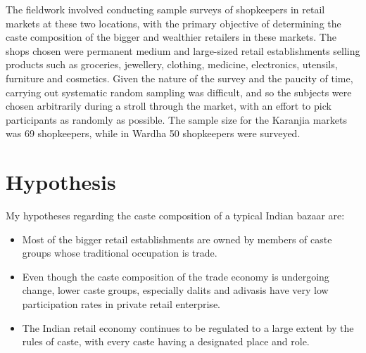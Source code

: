 \documentclass[12pt,a4paper,titlepage]{report}
\begin{document}
The fieldwork involved conducting sample surveys of shopkeepers in
retail markets at these two locations, with the primary objective of
determining the caste composition of the bigger and wealthier retailers
in these markets. The shops chosen were permanent medium and large-sized
retail establishments selling products such as groceries, jewellery,
clothing, medicine, electronics, utensils, furniture and cosmetics.
Given the nature of the survey and the paucity of time, carrying out
systematic random sampling was difficult, and so the subjects were
chosen arbitrarily during a stroll through the market, with an effort to
pick participants as randomly as possible. The sample size for the
Karanjia markets was 69 shopkeepers, while in Wardha 50 shopkeepers were
surveyed.

\section{Hypothesis}\label{hypothesis}

My hypotheses regarding the caste composition of a typical Indian bazaar
are:

\begin{itemize}
\item
  Most of the bigger retail establishments are owned by members of caste
  groups whose traditional occupation is trade.
\item
  Even though the caste composition of the trade economy is undergoing
  change, lower caste groups, especially dalits and adivasis have very
  low participation rates in private retail enterprise.
\item
  The Indian retail economy continues to be regulated to a large extent
  by the rules of caste, with every caste having a designated place and
  role.
\end{itemize}
\end{document}

